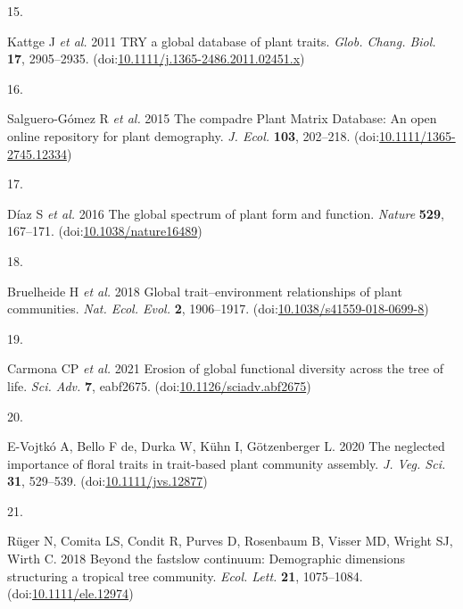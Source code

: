 \documentclass[
  12pt,
  a4paper,
]{article}
\newlength{\cslhangindent}
\newlength{\csllabelwidth}
\newlength{\cslentryspacingunit} %
\newenvironment{CSLReferences}[2] %
 {%
  \setlength{\parindent}{0pt}
  \ifodd #1
  \let\oldpar\par
  \def\par{\hangindent=\cslhangindent\oldpar}
  \fi
  \setlength{\parskip}{#2\cslentryspacingunit}
 }%
 {}
\newcommand{\CSLLeftMargin}[1]{\parbox[t]{\csllabelwidth}{#1}}
\newcommand{\CSLRightInline}[1]{\parbox[t]{\linewidth - \csllabelwidth}{#1}\break}
\begin{document}
\begin{CSLReferences}{0}{0}
\leavevmode{}%
\CSLLeftMargin{15. }
\CSLRightInline{Kattge J \emph{et al.} 2011 {TRY} \textendash{} a global database of plant traits. \emph{Glob. Chang. Biol.} \textbf{17}, 2905--2935. (doi:\href{https://doi.org/10.1111/j.1365-2486.2011.02451.x}{10.1111/j.1365-2486.2011.02451.x})}

\leavevmode{}%
\CSLLeftMargin{16. }
\CSLRightInline{Salguero-Gómez R \emph{et al.} 2015 The compadre {Plant Matrix Database}: An open online repository for plant demography. \emph{J. Ecol.} \textbf{103}, 202--218. (doi:\href{https://doi.org/10.1111/1365-2745.12334}{10.1111/1365-2745.12334})}

\leavevmode{}%
\CSLLeftMargin{17. }
\CSLRightInline{Díaz S \emph{et al.} 2016 The global spectrum of plant form and function. \emph{Nature} \textbf{529}, 167--171. (doi:\href{https://doi.org/10.1038/nature16489}{10.1038/nature16489})}

\leavevmode{}%
\CSLLeftMargin{18. }
\CSLRightInline{Bruelheide H \emph{et al.} 2018 Global trait--environment relationships of plant communities. \emph{Nat. Ecol. Evol.} \textbf{2}, 1906--1917. (doi:\href{https://doi.org/10.1038/s41559-018-0699-8}{10.1038/s41559-018-0699-8})}

\leavevmode{}%
\CSLLeftMargin{19. }
\CSLRightInline{Carmona CP \emph{et al.} 2021 Erosion of global functional diversity across the tree of life. \emph{Sci. Adv.} \textbf{7}, eabf2675. (doi:\href{https://doi.org/10.1126/sciadv.abf2675}{10.1126/sciadv.abf2675})}

\leavevmode{}%
\CSLLeftMargin{20. }
\CSLRightInline{E-Vojtkó A, Bello F de, Durka W, Kühn I, Götzenberger L. 2020 The neglected importance of floral traits in trait-based plant community assembly. \emph{J. Veg. Sci.} \textbf{31}, 529--539. (doi:\href{https://doi.org/10.1111/jvs.12877}{10.1111/jvs.12877})}

\leavevmode{}%
\CSLLeftMargin{21. }
\CSLRightInline{Rüger N, Comita LS, Condit R, Purves D, Rosenbaum B, Visser MD, Wright SJ, Wirth C. 2018 Beyond the fast\textendash slow continuum: Demographic dimensions structuring a tropical tree community. \emph{Ecol. Lett.} \textbf{21}, 1075--1084. (doi:\href{https://doi.org/10.1111/ele.12974}{10.1111/ele.12974})}


\end{CSLReferences}
\end{document}
